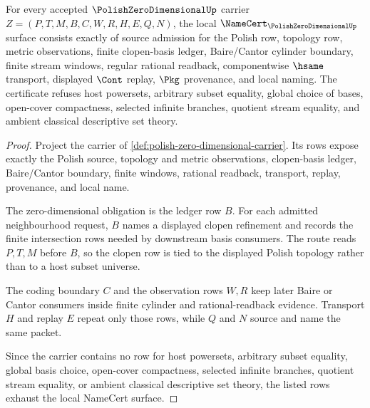 \begin{theorem}
\label{thm:polish-zero-dimensional-namecert-obligations}
For every accepted $\PolishZeroDimensionalUp$ carrier $Z=(P,T,M,B,C,W,R,H,E,Q,N)$, the local $\NameCert_{\PolishZeroDimensionalUp}$ surface consists exactly of source admission for the Polish row, topology row, metric observations, finite clopen-basis ledger, Baire/Cantor cylinder boundary, finite stream windows, regular rational readback, componentwise $\hsame$ transport, displayed $\Cont$ replay, $\Pkg$ provenance, and local naming. The certificate refuses host powersets, arbitrary subset equality, global choice of bases, open-cover compactness, selected infinite branches, quotient stream equality, and ambient classical descriptive set theory.
\end{theorem}
\begin{proof}
Project the carrier of \autoref{def:polish-zero-dimensional-carrier}. Its rows expose exactly the Polish source, topology and metric observations, clopen-basis ledger, Baire/Cantor boundary, finite windows, rational readback, transport, replay, provenance, and local name.

The zero-dimensional obligation is the ledger row $B$. For each admitted neighbourhood request, $B$ names a displayed clopen refinement and records the finite intersection rows needed by downstream basis consumers. The route reads $P,T,M$ before $B$, so the clopen row is tied to the displayed Polish topology rather than to a host subset universe.

The coding boundary $C$ and the observation rows $W,R$ keep later Baire or Cantor consumers inside finite cylinder and rational-readback evidence. Transport $H$ and replay $E$ repeat only those rows, while $Q$ and $N$ source and name the same packet.

Since the carrier contains no row for host powersets, arbitrary subset equality, global basis choice, open-cover compactness, selected infinite branches, quotient stream equality, or ambient classical descriptive set theory, the listed rows exhaust the local NameCert surface.
\end{proof}

